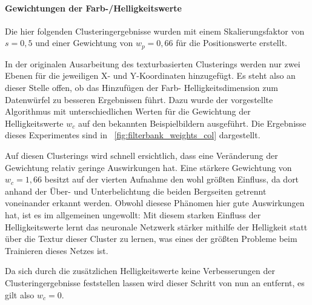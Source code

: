 \paragraph{Gewichtungen der Farb-/Helligkeitswerte}
Die hier folgenden Clusteringergebnisse wurden mit einem Skalierungsfaktor von $s=0,5$ und einer Gewichtung von $w_p=0,66$ für die Positionswerte erstellt.

In der originalen Ausarbeitung des texturbasierten Clusterings \cite{jain_91} werden nur zwei Ebenen für die jeweiligen X- und Y-Koordinaten hinzugefügt. Es steht also an dieser Stelle offen, ob das Hinzufügen der Farb- \bzw Helligkeitsdimension zum Datenwürfel zu besseren Ergebnissen führt. Dazu wurde der vorgestellte Algorithmus mit unterschiedlichen Werten für die Gewichtung der Helligkeitswerte $w_c$ auf den bekannten Beispielbildern ausgeführt. Die Ergebnisse dieses Experimentes sind in \figurename~\ref{fig:filterbank_weights_col} dargestellt.

Auf diesen Clusterings wird schnell ersichtlich, dass eine Veränderung der Gewichtung relativ geringe Auswirkungen hat. Eine stärkere Gewichtung von $w_c=1,66$ besitzt auf der vierten Aufnahme den wohl größten Einfluss, da dort anhand der Über- und Unterbelichtung die beiden Bergseiten getrennt voneinander erkannt werden. Obwohl diesese Phänomen hier gute Auswirkungen hat, ist es im allgemeinen ungewollt: Mit diesem starken Einfluss der Helligkeitswerte lernt das neuronale Netzwerk stärker mithilfe der Helligkeit statt über die Textur dieser Cluster zu lernen, was eines der größten Probleme beim Trainieren dieses Netzes ist.

Da sich durch die zusätzlichen Helligkeitswerte keine Verbesserungen der Clusteringergebnisse feststellen lassen wird dieser Schritt von nun an entfernt, es gilt also $w_c=0$.

